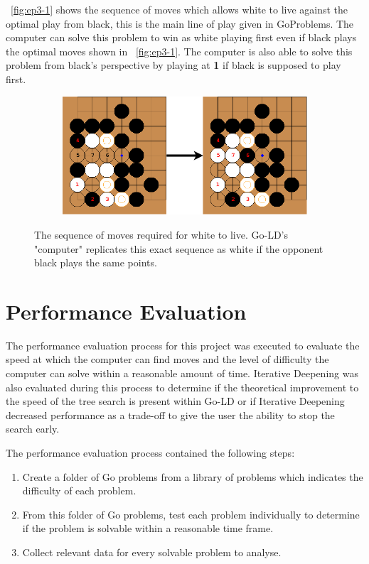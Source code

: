 \documentclass{l4proj}
\newcommand{\bo}[1]{\textbf{#1}}
\begin{document}
~\autoref{fig:ep3-1} shows the sequence of moves which allows white to live against the optimal play from black, this is the main line of play given in GoProblems. The computer can solve this problem to win as white playing first even if black plays the optimal moves shown in ~\autoref{fig:ep3-1}. The computer is also able to solve this problem from black's perspective by playing at \bo{1} if black is supposed to play first.





\begin{figure}[!ht]
\centering
\begin{subfigure}[b]{0.70\textwidth}
\centering
\includegraphics[width=\textwidth]{ep3/ep3-1.png}
\end{subfigure}
\caption{The sequence of moves required for white to live. Go-LD's "computer" replicates this exact sequence as white if the opponent black plays the same points.}
\label{fig:ep3-1}
\end{figure}

\section{Performance Evaluation}

The performance evaluation process for this project was executed to evaluate the speed at which the computer can find moves and the level of difficulty the computer can solve within a reasonable amount of time. Iterative Deepening was also evaluated during this process to determine if the theoretical improvement to the speed of the tree search is present within Go-LD or if Iterative Deepening decreased performance as a trade-off to give the user the ability to stop the search early.

The performance evaluation process contained the following steps:
\begin{enumerate}
\item Create a folder of Go problems from a library of problems which indicates the difficulty of each problem.
\item From this folder of Go problems, test each problem individually to determine if the problem is solvable within a reasonable time frame.
\item  Collect relevant data for every solvable problem to analyse.
\end{enumerate}
\end{document}

